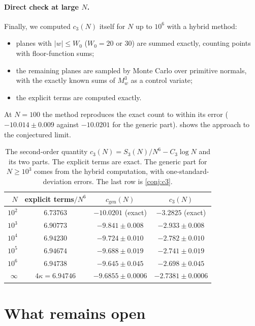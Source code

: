 \documentclass[11pt]{article}
\theoremstyle{definition}
\newcommand{\abs}[1]{\left\lvert #1 \right\rvert}
\begin{document}
\paragraph{Direct check at large $N$.} Finally, we computed $c_3(N)$ itself for $N$ up to $10^6$ with a hybrid method:
\begin{itemize}
\item planes with $\abs w\le W_0$ ($W_0=20$ or $30$) are summed exactly, counting points with floor-function sums;
\item the remaining planes are sampled by Monte Carlo over primitive normals, with the exactly known sums of $M_w^3$ as a control variate;
\item the explicit terms are computed exactly.
\end{itemize}
At $N=100$ the method reproduces the exact count to within its error ($-10.014\pm0.009$ against $-10.0201$ for the generic part).  shows the approach to the conjectured limit.

\begin{table}[htbp]
\centering
\begin{tabular}{@{}rccc@{}}
\toprule
$N$ & explicit terms$/N^6$ & $c_{\mathrm{gen}}(N)$ & $c_3(N)$ \\
\midrule
$10^2$ & $6.73763$ & $-10.0201$ (exact) & $-3.2825$ (exact) \\
$10^3$ & $6.90773$ & $-9.841\pm0.008$ & $-2.933\pm0.008$ \\
$10^4$ & $6.94230$ & $-9.724\pm0.010$ & $-2.782\pm0.010$ \\
$10^5$ & $6.94674$ & $-9.688\pm0.019$ & $-2.741\pm0.019$ \\
$10^6$ & $6.94738$ & $-9.645\pm0.045$ & $-2.698\pm0.045$ \\
\midrule
$\infty$ & $4\kappa=6.94746$ & $-9.6855\pm0.0006$ & $-2.7381\pm0.0006$ \\
\bottomrule
\end{tabular}
\caption{The second-order quantity $c_3(N)=S_3(N)/N^6-C_3\log N$ and its two parts. The explicit terms are exact. The generic part for $N\ge10^3$ comes from the hybrid computation, with one-standard-deviation errors. The last row is \cref{conj:c3}.}
\label{tab:c3N}
\end{table}

\FloatBarrier
\section{What remains open}\label{sec:rigor}
\end{document}

